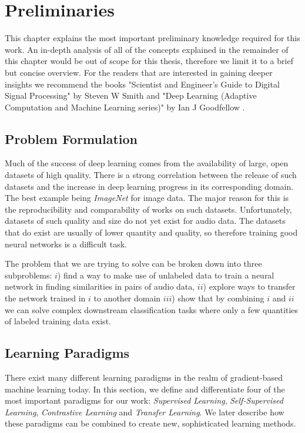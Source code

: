 
\chapter{Preliminaries}\label{chapter:preliminaries}

This chapter explains the most important preliminary knowledge required for this work. An in-depth analysis of all of the concepts explained in the remainder of this chapter would be out of scope for this thesis, therefore we limit it to a brief but concise overview. For the readers that are interested in gaining deeper insights we recommend the books "Scientist and Engineer's Guide to Digital Signal Processing" by Steven W Smith \cite{smith1997dsp} and "Deep Learning (Adaptive Computation and Machine Learning series)" by Ian J Goodfellow \cite{goodfellow2016deeplearning}.

\section{Problem Formulation}\label{sec:problem_definition}

Much of the success of deep learning comes from the availability of large, open datasets of high quality. There is a strong correlation between the release of such datasets and the increase in deep learning progress in its corresponding domain. The best example being \textit{ImageNet} \cite{imagenet_cvpr09} for image data. The major reason for this is the reproducibility and comparability of works on such datasets. Unfortunately, datasets of such quality and size do not yet exist for audio data. The datasets that do exist are usually of lower quantity and quality, so therefore training good neural networks is a difficult task. 

The problem that we are trying to solve can be broken down into three subproblems: $i$) find a way to make use of unlabeled data to train a neural network in finding similarities in pairs of audio data, $ii$) explore ways to transfer the network trained in $i$ to another domain $iii$) show that by combining $i$ and $ii$ we can solve complex downstream classification tasks where only a few quantities of labeled training data exist.

\section{Learning Paradigms}

There exist many different learning paradigms in the realm of gradient-based machine learning today. In this section, we define and differentiate four of the most important paradigms for our work: \textit{Supervised Learning}, \textit{Self-Supervised Learning}, \textit{Contrastive Learning} and \textit{Transfer Learning}. We later describe how these paradigms can be combined to create new, sophisticated learning methods.

